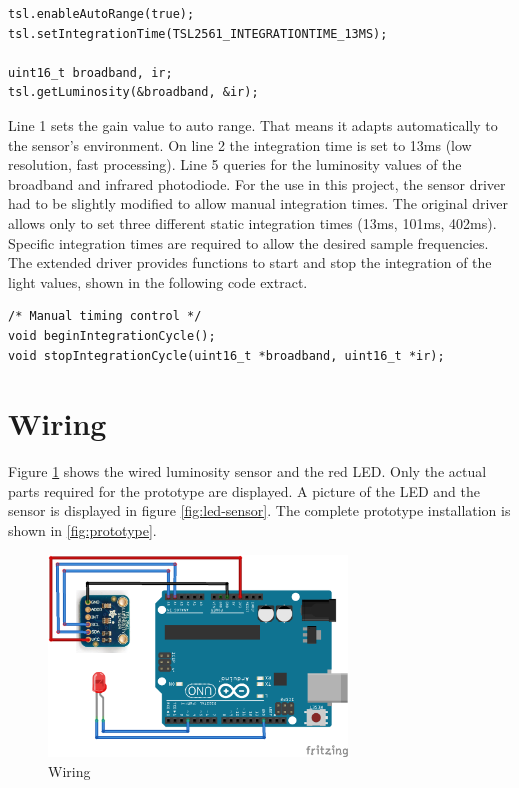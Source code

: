 \documentclass[notitlepage]{scrreprt}
\begin{document}
\begin{lstlisting}[caption=Adafruit driver]
tsl.enableAutoRange(true);
tsl.setIntegrationTime(TSL2561_INTEGRATIONTIME_13MS);

uint16_t broadband, ir;
tsl.getLuminosity(&broadband, &ir);
\end{lstlisting}

Line 1 sets the gain value to auto range. That means it adapts automatically to the sensor's environment. On line 2 the integration time is set to 13ms (low resolution, fast processing). Line 5 queries for the luminosity values of the broadband and infrared photodiode. For the use in this project, the sensor driver had to be slightly modified to allow manual integration times. The original driver allows only to set three different static integration times (13ms, 101ms, 402ms). Specific integration times are required to allow the desired sample frequencies. The extended driver provides functions to start and stop the integration of the light values, shown in the following code extract.

\begin{lstlisting}[caption=Adafruit\_TSL2561\_U.h]
/* Manual timing control */
void beginIntegrationCycle();
void stopIntegrationCycle(uint16_t *broadband, uint16_t *ir);
\end{lstlisting}

\newpage

\section{Wiring}
\label{sec:wiring}
Figure \ref{fig:wiring} shows the wired luminosity sensor and the red LED. Only the actual parts required for the prototype are displayed. A picture of the LED and the sensor is displayed in figure \ref{fig:led-sensor}. The complete prototype installation is shown in \ref{fig:prototype}.

\begin{figure}[H]
	\centering
	\includegraphics[width=300px]{images/wiring.png}
	\caption{Wiring}
	\label{fig:wiring}
\end{figure}
\end{document}
